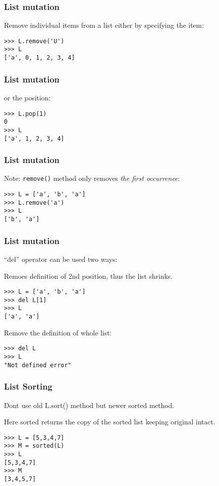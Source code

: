 \begin{frame}[fragile]\frametitle{List mutation}
Remove individual items from a list either by specifying the item:
\begin{lstlisting}
>>> L.remove('U')
>>> L
['a', 0, 1, 2, 3, 4]
\end{lstlisting}
\end{frame}

\begin{frame}[fragile]\frametitle{List mutation}
or the position:

\begin{lstlisting}
>>> L.pop(1)
0
>>> L
['a', 1, 2, 3, 4]
\end{lstlisting}
\end{frame}

\begin{frame}[fragile]\frametitle{List mutation}

Note: \texttt{remove()} method only removes \textit{the first occurrence}:

\begin{lstlisting}
>>> L = ['a', 'b', 'a']
>>> L.remove('a')
>>> L
['b', 'a']
\end{lstlisting}

\end{frame}

\begin{frame}[fragile]\frametitle{List mutation}

``del'' operator can be used two ways:

Remoes definition of 2nd position, thus the list shrinks.

\begin{lstlisting}
>>> L = ['a', 'b', 'a']
>>> del L[1]
>>> L
['a', 'a']
\end{lstlisting}

Remove the definition of whole list:
\begin{lstlisting}
>>> del L
>>> L
"Not defined error"
\end{lstlisting}

\end{frame}

\begin{frame}[fragile]\frametitle{List Sorting}

Dont use old L.sort() method but newer sorted method.

Here sorted returns the copy of the sorted list keeping original intact.

\begin{lstlisting}
>>> L = [5,3,4,7]
>>> M = sorted(L)
>>> L
[5,3,4,7]
>>> M
[3,4,5,7]
\end{lstlisting}

\end{frame}

